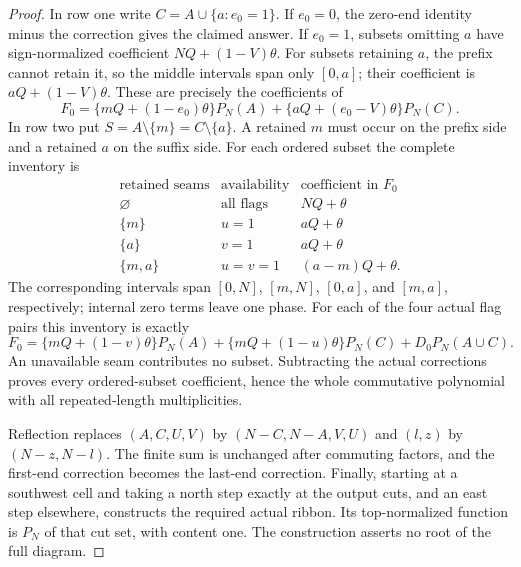 \documentclass[11pt,a4paper]{amsart}
\numberwithin{equation}{section}
\theoremstyle{plain}
\theoremstyle{definition}
\begin{document}
\begin{proof}
In row one write \(C=A\cup\{a:e_0=1\}\).
If \(e_0=0\), the zero-end identity minus the correction gives the claimed
answer.  If \(e_0=1\), subsets omitting \(a\) have sign-normalized coefficient
\(NQ+(1-V)\theta\).  For subsets retaining \(a\), the prefix cannot
retain it, so the middle intervals span only \([0,a]\); their coefficient is
\(aQ+(1-V)\theta\).  These are precisely the coefficients of
\[
 F_0=\{mQ+(1-e_0)\theta\}P_N(A)
       +\{aQ+(e_0-V)\theta\}P_N(C).
\]
In row two put \(S=A\setminus\{m\}=C\setminus\{a\}\).
A retained \(m\) must occur on the prefix side and a retained \(a\) on the
suffix side.  For each ordered subset the complete inventory is
\[
\begin{array}{c|c|c}
\text{retained seams}&\text{availability}&\text{coefficient in }F_0\\\hline
\varnothing&\text{all flags}&NQ+\theta\\
\{m\}&u=1&aQ+\theta\\
\{a\}&v=1&aQ+\theta\\
\{m,a\}&u=v=1&(a-m)Q+\theta.
\end{array}
\]
The corresponding intervals span \([0,N]\), \([m,N]\), \([0,a]\), and
\([m,a]\), respectively; internal zero terms leave one phase.
For each of the four actual flag pairs this inventory is exactly
\[
 F_0=\{mQ+(1-v)\theta\}P_N(A)
 +\{mQ+(1-u)\theta\}P_N(C)+D_0P_N(A\cup C).
\]
An unavailable seam contributes no subset.  Subtracting the actual
corrections proves every ordered-subset coefficient, hence the whole
commutative polynomial with all repeated-length multiplicities.

Reflection replaces \((A,C,U,V)\) by
\((N-C,N-A,V,U)\) and \((l,z)\) by \((N-z,N-l)\).
The finite sum is unchanged after commuting factors, and the first-end
correction becomes the last-end correction.  Finally, starting at a
southwest cell and taking a north step exactly at the output cuts, and an
east step elsewhere, constructs the required actual ribbon.
Its top-normalized function is \(P_N\) of that cut set, with content one.
The construction asserts no root of the full diagram.
\end{proof}
\end{document}
